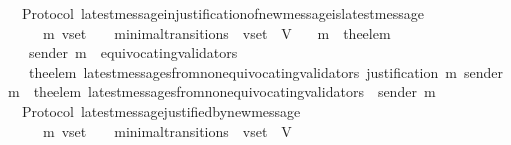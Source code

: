 \begin{isabellebody}
%
\isadelimproof
\isanewline
%
\endisadelimproof
\isanewline
\isanewline
\isanewline
\isanewline
{}\isamarkupfalse%
\ {\isacharparenleft}\ Protocol{\isacharparenright}\ latest{\isacharunderscore}message{\isacharunderscore}in{\isacharunderscore}justification{\isacharunderscore}of{\isacharunderscore}new{\isacharunderscore}message{\isacharunderscore}is{\isacharunderscore}latest{\isacharunderscore}message\ {\isacharcolon}\isanewline
\ \ {\isachardoublequoteopen}{\isasymforall}\ {\isasymsigma}\ {\isasymsigma}{\isacharprime}\ m{\isacharprime}\ v{\isacharunderscore}set{\isachardot}\ {\isacharparenleft}{\isasymsigma}{\isacharcomma}\ {\isasymsigma}{\isacharprime}{\isacharparenright}\ {\isasymin}\ minimal{\isacharunderscore}transitions\ {\isasymand}\ v{\isacharunderscore}set\ {\isasymsubseteq}\ V\isanewline
\ \ {\isasymlongrightarrow}\ m{\isacharprime}\ {\isacharequal}\ the{\isacharunderscore}elem\ {\isacharparenleft}{\isasymsigma}{\isacharprime}\ {\isacharminus}\ {\isasymsigma}{\isacharparenright}\isanewline
\ \ {\isasymlongrightarrow}\ sender\ m{\isacharprime}\ {\isasymnotin}\ equivocating{\isacharunderscore}validators\ {\isasymsigma}{\isacharprime}\isanewline
\ \ {\isasymlongrightarrow}\ the{\isacharunderscore}elem\ {\isacharparenleft}latest{\isacharunderscore}messages{\isacharunderscore}from{\isacharunderscore}non{\isacharunderscore}equivocating{\isacharunderscore}validators\ {\isacharparenleft}justification\ m{\isacharprime}{\isacharparenright}\ {\isacharparenleft}sender\ m{\isacharprime}{\isacharparenright}{\isacharparenright}\ {\isacharequal}\ the{\isacharunderscore}elem\ {\isacharparenleft}latest{\isacharunderscore}messages{\isacharunderscore}from{\isacharunderscore}non{\isacharunderscore}equivocating{\isacharunderscore}validators\ {\isasymsigma}\ {\isacharparenleft}sender\ m{\isacharprime}{\isacharparenright}{\isacharparenright}{\isachardoublequoteclose}\isanewline
%
\isadelimproof
\ \ %
\endisadelimproof
%
\isatagproof
{}\isamarkupfalse%
%
\endisatagproof
{\isafoldproof}%
%
\isadelimproof
\isanewline
%
\endisadelimproof
\isanewline
\isanewline
\isanewline
{}\isamarkupfalse%
\ {\isacharparenleft}\ Protocol{\isacharparenright}\ latest{\isacharunderscore}message{\isacharunderscore}justified{\isacharunderscore}by{\isacharunderscore}new{\isacharunderscore}message\ {\isacharcolon}\isanewline
\ \ {\isachardoublequoteopen}{\isasymforall}\ {\isasymsigma}\ {\isasymsigma}{\isacharprime}\ m{\isacharprime}\ v{\isacharunderscore}set{\isachardot}\ {\isacharparenleft}{\isasymsigma}{\isacharcomma}\ {\isasymsigma}{\isacharprime}{\isacharparenright}\ {\isasymin}\ minimal{\isacharunderscore}transitions\ {\isasymand}\ v{\isacharunderscore}set\ {\isasymsubseteq}\ V\isanewline

\end{isabellebody}
